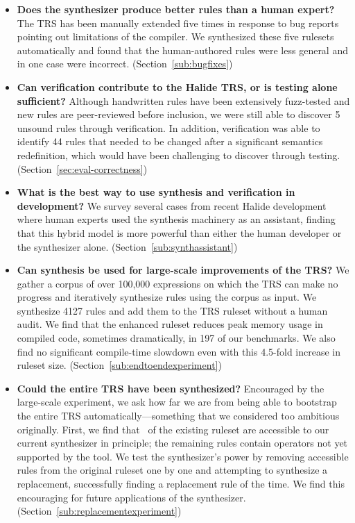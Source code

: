 \documentclass[acmsmall,review]{acmart}\settopmatter{printfolios=true,printccs=false,printacmref=false}
\begin{document}
\begin{itemize}
  \item \textbf{Does the synthesizer produce better rules than a human expert?} The TRS has been manually extended five times in response to bug reports pointing out limitations of the compiler. We synthesized these five rulesets automatically and found that the human-authored rules were less general and in one case were incorrect. (Section~\ref{sub:bugfixes})
  \item \textbf{Can verification contribute to the Halide TRS, or is testing alone sufficient?} Although handwritten rules have been extensively fuzz-tested and new rules are peer-reviewed before inclusion, we were still able to discover 5 unsound rules through verification. In addition, verification was able to identify 44 rules that needed to be changed after a significant semantics redefinition, which would have been challenging to discover through testing. (Section~\ref{sec:eval-correctness})
  \item \textbf{What is the best way to use synthesis and verification in development?} We survey several cases from recent Halide development where human experts used the synthesis machinery as an assistant, finding that this hybrid model is more powerful than either the human developer or the synthesizer alone. (Section~\ref{sub:synthassistant})
  \item \textbf{Can synthesis be used for large-scale improvements of the TRS?} We gather a corpus of over 100,000 expressions on which the TRS can make no progress and iteratively synthesize rules using the corpus as input. We synthesize 4127 rules and add them to the TRS ruleset without a human audit. We find that the enhanced ruleset reduces peak memory usage in compiled code, sometimes dramatically, in 197 of our benchmarks. We also find no significant compile-time slowdown even with this 4.5-fold increase in ruleset size. (Section~\ref{sub:endtoendexperiment})
  \item \textbf{Could the entire TRS have been synthesized?} Encouraged by the large-scale experiment, we ask how far we are from being able to bootstrap the entire TRS automatically---something that we considered too ambitious originally. First, we find that \PercentPossibleToSynth~of the existing ruleset are accessible to our current synthesizer in principle; the remaining rules contain operators not yet supported by the tool. %
  We test the synthesizer's power by removing \NumRulesInCorrectnessExperiment{} accessible rules from the original ruleset one by one and attempting to synthesize a replacement, successfully finding a replacement rule \PercentRulesResynthesized{} of the time.  We find this encouraging for future applications of the synthesizer. (Section~\ref{sub:replacementexperiment})
\end{itemize}
\end{document}
